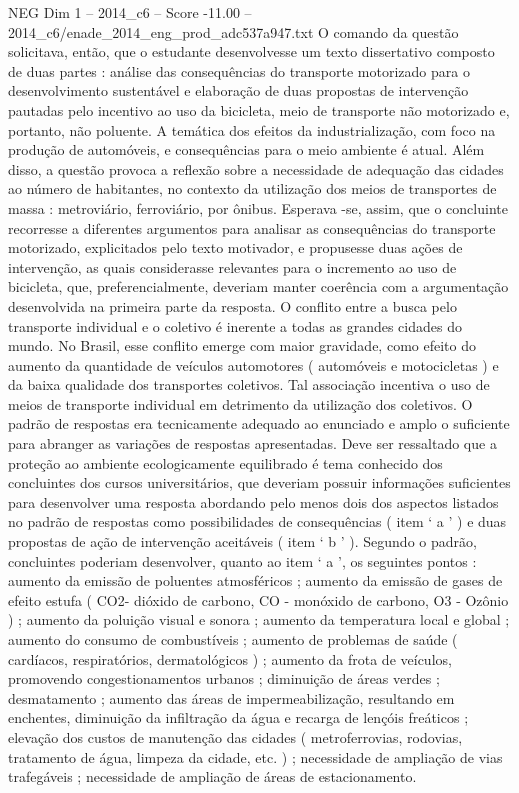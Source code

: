\begin{textsample}{NEG Dim 1 – 2014\_c6 – Score -11.00 – 2014\_c6/enade\_2014\_eng\_prod\_adc537a947.txt}
O comando da questão solicitava, então, que o estudante desenvolvesse um texto dissertativo composto de duas partes : análise das consequências do transporte motorizado para o desenvolvimento sustentável e elaboração de duas propostas de intervenção pautadas pelo incentivo ao uso da bicicleta, meio de transporte não motorizado e, portanto, não poluente.
A temática dos efeitos da industrialização, com foco na produção de automóveis, e consequências para o meio ambiente é atual.
Além disso, a questão provoca a reflexão sobre a necessidade de adequação das cidades ao número de habitantes, no contexto da utilização dos meios de transportes de massa : metroviário, ferroviário, por ônibus.
Esperava -se, assim, que o concluinte recorresse a diferentes argumentos para analisar as consequências do transporte motorizado, explicitados pelo texto motivador, e propusesse duas ações de intervenção, as quais considerasse relevantes para o incremento ao uso de bicicleta, que, preferencialmente, deveriam manter coerência com a argumentação desenvolvida na primeira parte da resposta.
O conflito entre a busca pelo transporte individual e o coletivo é inerente a todas as grandes cidades do mundo.
No Brasil, esse conflito emerge com maior gravidade, como efeito do aumento da quantidade de veículos automotores ( automóveis e motocicletas ) e da baixa qualidade dos transportes coletivos.
Tal associação incentiva o uso de meios de transporte individual em detrimento da utilização dos coletivos.
O padrão de respostas era tecnicamente adequado ao enunciado e amplo o suficiente para abranger as variações de respostas apresentadas.
Deve ser ressaltado que a proteção ao ambiente ecologicamente equilibrado é tema conhecido dos concluintes dos cursos universitários, que deveriam possuir informações suficientes para desenvolver uma resposta abordando pelo menos dois dos aspectos listados no padrão de respostas como possibilidades de consequências ( item ‘ a ’ ) e duas propostas de ação de intervenção aceitáveis ( item ‘ b ’ ).
Segundo o padrão, concluintes poderiam desenvolver, quanto ao item ‘ a ’, os seguintes pontos : aumento da emissão de poluentes atmosféricos ; aumento da emissão de gases de efeito estufa ( CO2- dióxido de carbono, CO - monóxido de carbono, O3 - Ozônio ) ; aumento da poluição visual e sonora ; aumento da temperatura local e global ; aumento do consumo de combustíveis ; aumento de problemas de saúde ( cardíacos, respiratórios, dermatológicos ) ; aumento da frota de veículos, promovendo congestionamentos urbanos ; diminuição de áreas verdes ; desmatamento ; aumento das áreas de impermeabilização, resultando em enchentes, diminuição da infiltração da água e recarga de lençóis freáticos ; elevação dos custos de manutenção das cidades ( metroferrovias, rodovias, tratamento de água, limpeza da cidade, etc. ) ; necessidade de ampliação de vias trafegáveis ; necessidade de ampliação de áreas de estacionamento.

\end{textsample}
